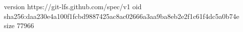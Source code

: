 version https://git-lfs.github.com/spec/v1
oid sha256:daa230e4a100f1fcbd9887425ac8ac02666a3aa9ba8eb2e2f1c61f4dc5a0b74e
size 77966
